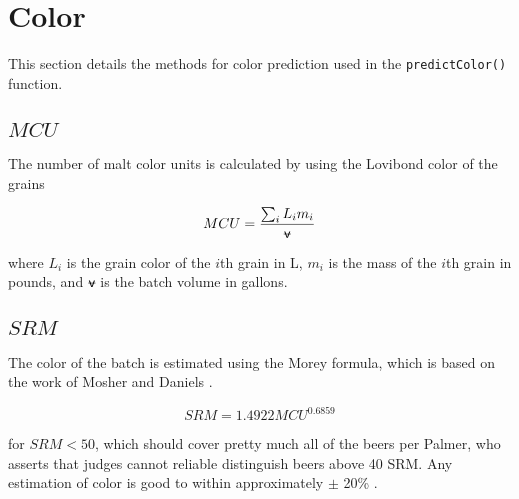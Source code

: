 \documentclass[../main.tex]{subfiles}
\begin{document}
\section{Color}
    This section details the methods for color prediction used in the \texttt{predictColor()} function.

    \subsection{$MCU$}
    The number of malt color units is calculated by using the Lovibond color of the grains
    
        \begin{equation}
            MCU = \frac{\sum_{i}L_{i}m_{i}}{\vol}
        \end{equation}
        
    where $L_{i}$ is the grain color of the $i$th grain in \tdeg L, $m_{i}$ is the mass of the $i$th grain in pounds, and $\vol$ is the batch volume in gallons.
    
    \subsection{$SRM$}
    The color of the batch is estimated using the Morey formula, which is based on the work of Mosher and Daniels \cite{morey}.
    
        \begin{equation}
            SRM = 1.4922 MCU^{0.6859}
            \label{eq:srm}
        \end{equation}
    
    for $SRM < 50$, which should cover pretty much all of the beers per Palmer, who asserts that judges cannot reliable distinguish beers above 40 \tdeg SRM. Any estimation of color is good to within approximately $\pm$ 20\% \cite{Palmer}.
\end{document}
